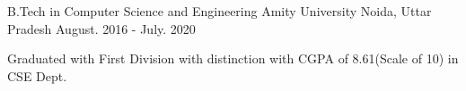 

\begin{cventries}

  \cventry
    {B.Tech in Computer Science and Engineering} %
    {Amity University } %
    {Noida, Uttar Pradesh} %
    {August. 2016 - July. 2020} %
    {
      \begin{cvitems} %
        \item {Graduated with First Division with distinction with CGPA of 8.61(Scale of 10) in CSE Dept.}
      \end{cvitems}
    }

\end{cventries}
